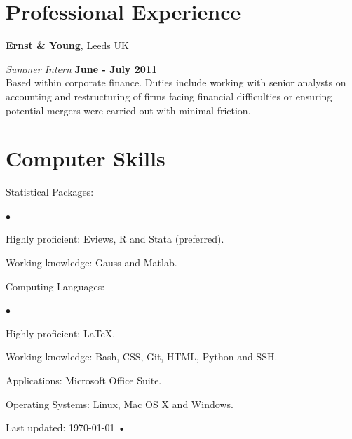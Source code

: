 \documentclass[margin,line,9pt]{res}
\newenvironment{list1}{
  \begin{list}{\ding{113}}{%
      \setlength{\itemsep}{0in}
      \setlength{\parsep}{0in} \setlength{\parskip}{0in}
      \setlength{\topsep}{0in} \setlength{\partopsep}{0in} 
      \setlength{\leftmargin}{0.17in}}}{\end{list}}
\newenvironment{list2}{
  \begin{list}{$\bullet$}{%
      \setlength{\itemsep}{0in}
      \setlength{\parsep}{0in} \setlength{\parskip}{0in}
      \setlength{\topsep}{0in} \setlength{\partopsep}{0in} 
      \setlength{\leftmargin}{0.2in}}}{\end{list}}
\begin{document}
\begin{resume}
\section{\sc Professional Experience}
{\bf Ernst \& Young}, Leeds UK

\vspace{-.3cm}
{\em Summer Intern} \hfill {\bf June - July 2011}\\
Based within corporate finance. Duties include working with senior analysts on accounting and restructuring of firms facing financial difficulties or ensuring potential mergers were carried out with minimal friction.

\section{\sc Computer Skills} 
\begin{list1}
\item[] Statistical Packages:
	\begin{list2}
		\item Highly proficient: Eviews, R and Stata (preferred).	
		\item Working knowledge: Gauss and Matlab.
	\end{list2}
	\smallskip
\item[] Computing Languages:
	\begin{list2}
		\item Highly proficient: \LaTeX.	
		\item Working knowledge: Bash, CSS, Git, HTML, Python and SSH.
	\end{list2}
	\smallskip
\item[] Applications: Microsoft Office Suite.
	\smallskip
\item[] Operating Systems:  Linux, Mac OS X and Windows.\\ 
\end{list1}

\begin{center}
{Last updated: \today\- •\- }
\end{center}

\end{resume}
\end{document}
